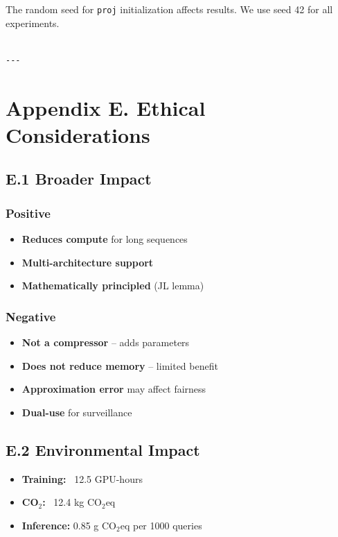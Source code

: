 The random seed for \texttt{proj} initialization affects results. We use seed 
42 for all experiments.
\begin{lstlisting}

---
\end{lstlisting}


\section{Appendix E. Ethical Considerations}

\subsection{E.1 Broader Impact}

\subsubsection{Positive}
\begin{itemize}
\item \textbf{Reduces compute} for long sequences
\item \textbf{Multi-architecture support}
\item \textbf{Mathematically principled} (JL lemma)

\end{itemize}
\subsubsection{Negative}
\begin{itemize}
\item \textbf{Not a compressor} -- adds parameters
\item \textbf{Does not reduce memory} -- limited benefit
\item \textbf{Approximation error} may affect fairness
\item \textbf{Dual-use} for surveillance

\end{itemize}
\subsection{E.2 Environmental Impact}

\begin{itemize}
\item \textbf{Training:} ~12.5 GPU-hours
\item \textbf{CO$_2$:} ~12.4 kg CO$_2$eq
\item \textbf{Inference:} 0.85 g CO$_2$eq per 1000 queries

\end{itemize}
